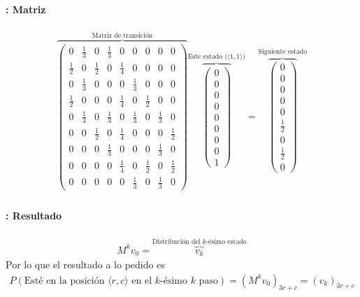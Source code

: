 \documentclass{beamer}
\begin{document}
\begin{frame}
  \frametitle{\SECTIONC}
  \framesubtitle{\EJC: Matriz}

  \begin{gather*}
    \overbrace{\begin{pmatrix}
        0 & \frac{1}{3} & 0 & \frac{1}{3} & 0 & 0 & 0 & 0 & 0  \\
        \frac{1}{2} & 0 & \frac{1}{2} & 0 & \frac{1}{4} & 0 & 0 & 0 & 0  \\
        0 & \frac{1}{3} & 0 & 0 & 0 & \frac{1}{3} & 0 & 0 & 0  \\
        \frac{1}{2} & 0 & 0 & 0 & \frac{1}{4} & 0 & \frac{1}{2} & 0 & 0  \\
        0 & \frac{1}{3} & 0 & \frac{1}{3} & 0 & \frac{1}{3} & 0 & \frac{1}{3} & 0  \\
        0 & 0 & \frac{1}{2} & 0 & \frac{1}{4} & 0 & 0 & 0 & \frac{1}{2} \\
        0 & 0 & 0 & \frac{1}{3} & 0 & 0 & 0 & \frac{1}{3} & 0  \\
        0 & 0 & 0 & 0 & \frac{1}{4} & 0 & \frac{1}{2} & 0 & \frac{1}{2} \\
        0 & 0 & 0 & 0 & 0 & \frac{1}{3} & 0 & \frac{1}{3} & 0
    \end{pmatrix}}^{\text{Matriz de transición}}
    \overbrace{\begin{pmatrix}
      0 \\ 0 \\ 0 \\ 0 \\ 0 \\ 0 \\ 0 \\ 0 \\ 1 
    \end{pmatrix}}^{\text{Este estado (\(\langle 1, 1 \rangle\))}}
    =
    \overbrace{\begin{pmatrix}
      0 \\ 0 \\ 0 \\ 0 \\ 0 \\ \frac{1}{2} \\ 0 \\ \frac{1}{2} \\ 0 
    \end{pmatrix}}^{\text{Siguiente estado}}
  \end{gather*}
\end{frame}

\begin{frame}
  \frametitle{\SECTIONC}
  \framesubtitle{\EJC: Resultado}

  \begin{gather*}
    M^{k} v_{0} = \overbrace{v_{k}}^{\text{Distribución del \(k\)-ésimo estado}}
  \end{gather*} \pause
  Por lo que el resultado a lo pedido es
  \begin{gather*}
    P(\text{Esté en la posición } \langle r, c \rangle \text{ en el \(k\)-ésimo } k \text{ paso}) = (M^{k}v_{0})_{3r + c} = (v_{k})_{3r + c}
  \end{gather*}
\end{frame}
\end{document}
